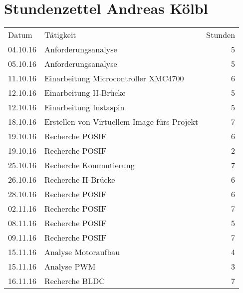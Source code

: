 \chapter{Stundenzettel Andreas Kölbl}
\begin{minipage}{0.5\textwidth}
    \begin{tabular}{lp{4cm}r}
       Datum& Tätigkeit&Stunden\\
       
       04.10.16&Anforderungsanalyse&5 \\
       05.10.16&Anforderungsanalyse&5 \\
       
       11.10.16&Einarbeitung Microcontroller XMC4700&6 \\
       12.10.16&Einarbeitung H-Brücke&5 \\
       12.10.16&Einarbeitung Instaspin&5 \\
       
       18.10.16&Erstellen von Virtuellem Image fürs Projekt&7 \\
       19.10.16&Recherche POSIF&6 \\
       19.10.16&Recherche POSIF&2 \\
       
       
       25.10.16&Recherche Kommutierung&7 \\
       26.10.16&Recherche H-Brücke&6 \\
       
       28.10.16&Recherche POSIF&6\\
       02.11.16&Recherche POSIF&7 \\
       
       08.11.16&Recherche POSIF&5 \\
       09.11.16&Recherche POSIF&7 \\
       
       15.11.16&Analyse Motoraufbau&4 \\
       15.11.16&Analyse PWM&3 \\
       16.11.16&Recherche BLDC&7 \\


    \end{tabular}
\end{minipage}
